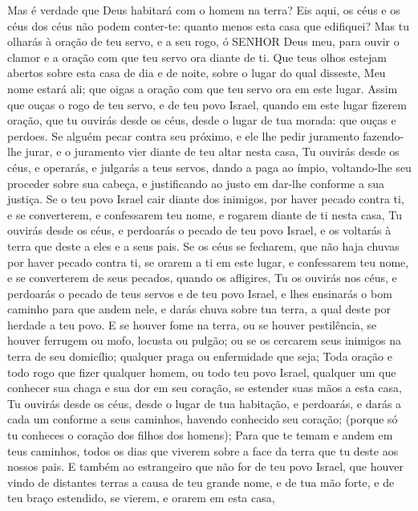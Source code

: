 {Mas é verdade que Deus habitará com o homem na terra? Eis aqui, os céus e os céus dos céus não podem conter-te: quanto menos esta casa que edifiquei?
Mas tu olharás à oração de teu servo, e a seu rogo, ó SENHOR Deus meu, para ouvir o clamor e a oração com que teu servo ora diante de ti.
Que teus olhos estejam abertos sobre esta casa de dia e de noite, sobre o lugar do qual disseste, Meu nome estará ali; que oigas a oração com que teu servo ora em este lugar.
Assim que ouças o rogo de teu servo, e de teu povo Israel, quando em este lugar fizerem oração, que tu ouvirás desde os céus, desde o lugar de tua morada: que ouças e perdoes.
Se alguém pecar contra seu próximo, e ele lhe pedir juramento fazendo-lhe jurar, e o juramento vier diante de teu altar nesta casa,
Tu ouvirás desde os céus, e operarás, e julgarás a teus servos, dando a paga ao ímpio, voltando-lhe seu proceder sobre sua cabeça, e justificando ao justo em dar-lhe conforme a sua justiça.
Se o teu povo Israel cair diante dos inimigos, por haver pecado contra ti, e se converterem, e confessarem teu nome, e rogarem diante de ti nesta casa,
Tu ouvirás desde os céus, e perdoarás o pecado de teu povo Israel, e os voltarás à terra que deste a eles e a seus pais.
Se os céus se fecharem, que não haja chuvas por haver pecado contra ti, se orarem a ti em este lugar, e confessarem teu nome, e se converterem de seus pecados, quando os afligires,
Tu os ouvirás nos céus, e perdoarás o pecado de teus servos e de teu povo Israel, e lhes ensinarás o bom caminho para que andem nele, e darás chuva sobre tua terra, a qual deste por herdade a teu povo.
E se houver fome na terra, ou se houver pestilência, se houver ferrugem ou mofo, locusta ou pulgão; ou se os cercarem seus inimigos na terra de seu domicílio; qualquer praga ou enfermidade que seja;
Toda oração e todo rogo que fizer qualquer homem, ou todo teu povo Israel, qualquer um que conhecer sua chaga e sua dor em seu coração, se estender suas mãos a esta casa,
Tu ouvirás desde os céus, desde o lugar de tua habitação, e perdoarás, e darás a cada um conforme a seus caminhos, havendo conhecido seu coração; (porque só tu conheces o coração dos filhos dos homens);
Para que te temam e andem em teus caminhos, todos os dias que viverem sobre a face da terra que tu deste aos nossos pais.
E também ao estrangeiro que não for de teu povo Israel, que houver vindo de distantes terras a causa de teu grande nome, e de tua mão forte, e de teu braço estendido, se vierem, e orarem em esta casa,
}
